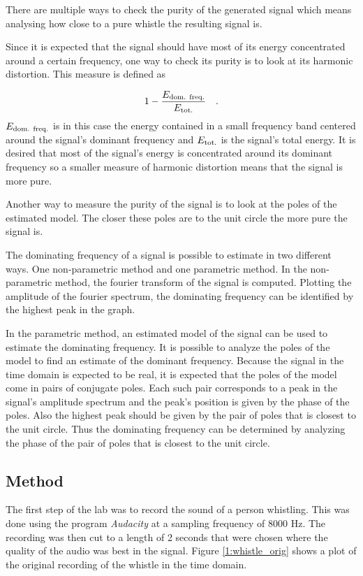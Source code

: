 \documentclass{IEEEtran}
\begin{document}
There are multiple ways to check the purity of the generated signal which
means analysing how close to a pure whistle the resulting signal is.

Since it is expected that the signal should have most of its energy
concentrated around a certain frequency, one way to check its purity
is to look at its harmonic distortion. This measure is defined as

\begin{equation}
  \label{1:hdist}
  1 - \frac{E_{\textnormal{dom. freq.}}}{E_{\textnormal{tot.}}}\quad .
\end{equation}
$E_{\textnormal{dom. freq.}}$ is in this case the energy contained in
a small frequency band centered around the signal's dominant frequency
and $E_{\textnormal{tot.}}$ is the signal's total energy. It is desired
that most of the signal's energy is concentrated around its dominant
frequency so a smaller measure of harmonic distortion means that the
signal is more pure.

Another way to measure the purity of the signal is to look at the poles
of the estimated model. The closer these poles are to the unit circle
the more pure the signal is.

The dominating frequency of a signal is possible to estimate in two
different ways. One non-parametric method and one parametric method.
In the non-parametric method, the fourier transform of the signal is
computed. Plotting the amplitude of the fourier spectrum, the dominating
frequency can be identified by the highest peak in the graph.

In the parametric method, an estimated model of the signal can be used to
estimate the dominating frequency. It is possible to analyze the poles of the
model to find an estimate of the dominant frequency. Because the signal in the
time domain is expected to be real, it is expected that the poles of the
model come in pairs of conjugate poles. Each such pair corresponds to a
peak in the signal's amplitude spectrum and the peak's position is given
by the phase of the poles. Also the highest peak should be given by the pair
of poles that is closest to the unit circle. Thus the dominating frequency can
be determined by analyzing the phase of the pair of poles that is closest
to the unit circle.

\subsection{Method}
\label{sub:whistlemethod}
The first step of the lab was to record the sound of a person
whistling. This was done using the program \textit{Audacity}
\cite{audacity} at a sampling frequency of 8000 Hz. The recording was then
cut to a length of 2 seconds that were chosen where the quality of the
audio was best in the signal. Figure \ref{1:whistle_orig} shows a plot
of the original recording of the whistle in the time domain.
\end{document}
